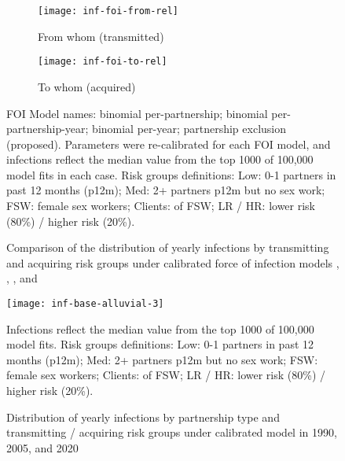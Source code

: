 \begin{figure}[h]
  \begin{subfigure}{\linewidth}
    \centerline{\texttt{[image: inf-foi-from-rel]}}
    \caption{From whom (transmitted)}
    \label{fig:inf.from}
  \end{subfigure}
  \begin{subfigure}{\linewidth}
    \centerline{\texttt{[image: inf-foi-to-rel]}}
    \caption{To whom (acquired)}
    \label{fig:inf.to}
  \end{subfigure}
  \caption{Comparison of the distribution of yearly infections
    by transmitting and acquiring risk groups
    under calibrated force of infection models , , , and }
  \label{fig:inf.frto}
  \floatfoot
  FOI Model names:
   binomial per-partnership;
   binomial per-partnership-year;
   binomial per-year;
   partnership exclusion (proposed).
  Parameters were re-calibrated for each FOI model,
  and infections reflect the median value from
  the top 1000 of 100,000 model fits in each case.
  Risk groups definitions:
  Low: 0-1 partners in past 12 months (p12m);
  Med: 2+ partners p12m but no sex work;
  FSW: female sex workers;
  Clients: of FSW;
  LR / HR: lower risk (80\%) / higher risk (20\%).
\end{figure}
\begin{figure}[h]
  \centerline{\texttt{[image: inf-base-alluvial-3]}}
  \caption{Distribution of yearly infections
    by partnership type and transmitting / acquiring risk groups
    under calibrated model  in 1990, 2005, and 2020}
  \label{fig:inf.alluvial}
  \floatfoot
  Infections reflect the median value from
  the top 1000 of 100,000 model  fits.
  Risk groups definitions:
  Low: 0-1 partners in past 12 months (p12m);
  Med: 2+ partners p12m but no sex work;
  FSW: female sex workers;
  Clients: of FSW;
  LR / HR: lower risk (80\%) / higher risk (20\%).
\end{figure}